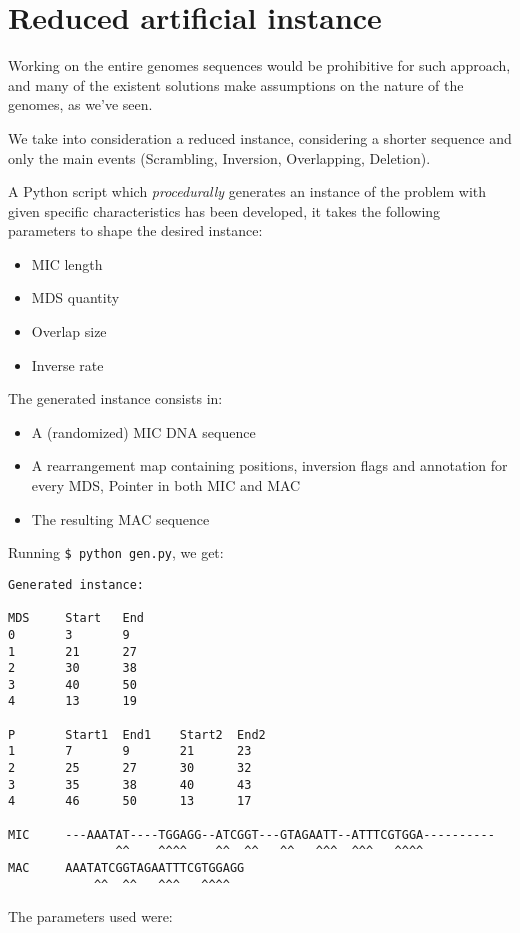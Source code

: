 \section{Reduced artificial instance}
\label{gen}

Working on the entire genomes sequences would be prohibitive for such approach, and many of the existent solutions make assumptions on the nature of the genomes, as we've seen.

We take into consideration a reduced instance, considering a shorter sequence and only the main events (Scrambling, Inversion, Overlapping, Deletion).

A Python script which \textit{procedurally} generates an instance of the problem with given specific characteristics has been developed, it takes the following parameters to shape the desired instance:

\begin{itemize}
	\item MIC length
	\item MDS quantity
	\item Overlap size
	\item Inverse rate
\end{itemize}

The generated instance consists in:

\begin{itemize}
	\item A (randomized) MIC DNA sequence
	\item A rearrangement map containing positions, inversion flags and annotation for every MDS, Pointer in both MIC and MAC
	\item The resulting MAC sequence
\end{itemize}

\clearpage

Running \texttt{\$ python gen.py}, we get:
\begin{verbatim}
Generated instance:

MDS     Start   End
0       3       9
1       21      27
2       30      38
3       40      50
4       13      19

P       Start1  End1    Start2  End2
1       7       9       21      23
2       25      27      30      32
3       35      38      40      43
4       46      50      13      17

MIC     ---AAATAT----TGGAGG--ATCGGT---GTAGAATT--ATTTCGTGGA----------
               ^^    ^^^^    ^^  ^^   ^^   ^^^  ^^^   ^^^^
MAC     AAATATCGGTAGAATTTCGTGGAGG
            ^^  ^^   ^^^   ^^^^
\end{verbatim}
The parameters used were:

